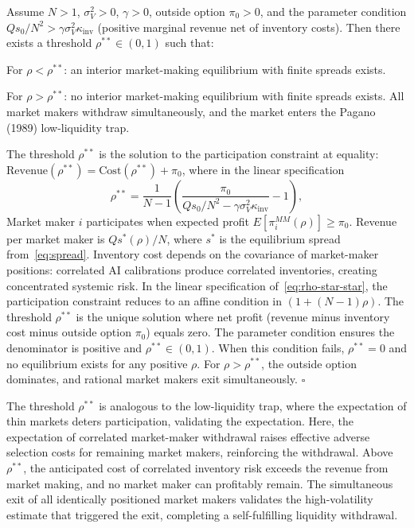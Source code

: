 \begin{proposition}\label{prop:rho-star-star}
  Assume $N > 1$, $\sigma_V^2 > 0$, $\gamma > 0$, outside option $\pi_0 > 0$, and the parameter condition $Qs_0/N^2 > \gamma\sigma_V^2\kappa_{\text{inv}}$ (positive marginal revenue net of inventory costs). Then there exists a threshold $\rho^{**} \in (0,1)$ such that:

   For $\rho < \rho^{**}$: an interior market-making equilibrium with finite spreads exists.

   For $\rho > \rho^{**}$: no interior market-making equilibrium with finite spreads exists. All market makers withdraw simultaneously, and the market enters the Pagano (1989) low-liquidity trap.

  The threshold $\rho^{**}$ is the solution to the participation constraint at equality: $\mathrm{Revenue}(\rho^{**}) = \mathrm{Cost}(\rho^{**}) + \pi_0$, where in the linear specification
  \begin{equation}\label{eq:rho-star-star}
    \rho^{**} = \frac{1}{N-1}\left(\frac{\pi_0}{Q s_0/N^2 - \gamma\sigma_V^2\kappa_{\text{inv}}} - 1\right),
  \end{equation}
   Market maker $i$ participates when expected profit $E[\pi_i^{MM}(\rho)] \geq \pi_0$. Revenue per market maker is $Qs^*(\rho)/N$, where $s^*$ is the equilibrium spread from~\eqref{eq:spread}. Inventory cost depends on the covariance of market-maker positions: correlated AI calibrations produce correlated inventories, creating concentrated systemic risk. In the linear specification of~\eqref{eq:rho-star-star}, the participation constraint reduces to an affine condition in $(1+(N-1)\rho)$. The threshold $\rho^{**}$ is the unique solution where net profit (revenue minus inventory cost minus outside option $\pi_0$) equals zero. The parameter condition ensures the denominator is positive and $\rho^{**} \in (0,1)$. When this condition fails, $\rho^{**} = 0$ and no equilibrium exists for any positive $\rho$. For $\rho > \rho^{**}$, the outside option dominates, and rational market makers exit simultaneously. $\square$
\end{proposition}

The threshold $\rho^{**}$ is analogous to the \citet{pagano1989} low-liquidity trap, where the expectation of thin markets deters participation, validating the expectation. Here, the expectation of correlated market-maker withdrawal raises effective adverse selection costs for remaining market makers, reinforcing the withdrawal. Above $\rho^{**}$, the anticipated cost of correlated inventory risk exceeds the revenue from market making, and no market maker can profitably remain. The simultaneous exit of all identically positioned market makers validates the high-volatility estimate that triggered the exit, completing a self-fulfilling liquidity withdrawal.

